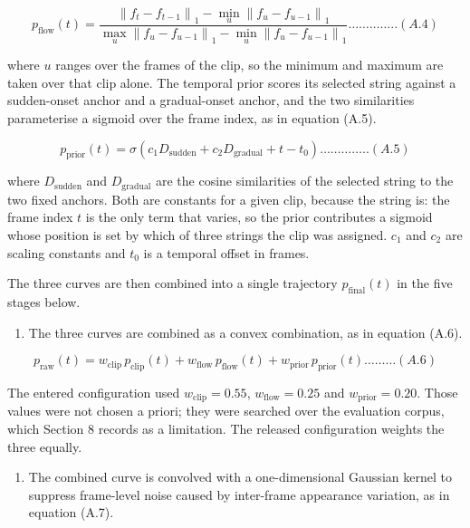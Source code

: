 \[p_{\text{flow}}(t) = \frac{\left\| f_{t} - f_{t-1} \right\|_{1} - \min_{u}\left\| f_{u} - f_{u-1} \right\|_{1}}{\max_{u}\left\| f_{u} - f_{u-1} \right\|_{1} - \min_{u}\left\| f_{u} - f_{u-1} \right\|_{1}}\ldots\ldots\ldots\ldots..(A.4)\]

where \(u\) ranges over the frames of the clip, so the minimum and maximum are taken over that clip alone. The temporal prior scores its selected string against a sudden-onset anchor and a gradual-onset anchor, and the two similarities parameterise a sigmoid over the frame index, as in equation (A.5).

\[p_{\text{prior}}(t) = \sigma\left( c_{1}D_{\text{sudden}} + c_{2}D_{\text{gradual}} + t - t_{0} \right)\ldots\ldots\ldots\ldots..(A.5)\]

where \(D_{\text{sudden}}\) and \(D_{\text{gradual}}\) are the cosine similarities of the selected string to the two fixed anchors. Both are constants for a given clip, because the string is: the frame index \(t\) is the only term that varies, so the prior contributes a sigmoid whose position is set by which of three strings the clip was assigned. \(c_{1}\) and \(c_{2}\) are scaling constants and \(t_{0}\) is a temporal offset in frames.

The three curves are then combined into a single trajectory \(p_{\text{final}}(t)\) in the five stages below.

\begin{enumerate}
\def\labelenumi{\arabic{enumi}.}
\item
  The three curves are combined as a convex combination, as in equation (A.6).
\end{enumerate}

\[p_{\text{raw}}(t) = w_{\text{clip}}\,p_{\text{clip}}(t) + w_{\text{flow}}\,p_{\text{flow}}(t) + w_{\text{prior}}\,p_{\text{prior}}(t)\ldots\ldots\ldots(A.6)\]

The entered configuration used \(w_{\text{clip}} = 0.55\), \(w_{\text{flow}} = 0.25\) and \(w_{\text{prior}} = 0.20\). Those values were not chosen a priori; they were searched over the evaluation corpus, which Section 8 records as a limitation. The released configuration weights the three equally.

\begin{enumerate}
\def\labelenumi{\arabic{enumi}.}
\setcounter{enumi}{1}
\item
  The combined curve is convolved with a one-dimensional Gaussian kernel to suppress frame-level noise caused by inter-frame appearance variation, as in equation (A.7).
\end{enumerate}

